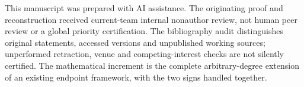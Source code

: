 This manuscript was prepared with AI assistance. The originating
proof and reconstruction received current-team internal nonauthor
review, not human peer review or a global priority certification.
The bibliography audit distinguishes original statements, accessed
versions and unpublished working sources; unperformed retraction,
venue and competing-interest checks are not silently certified.
The mathematical increment is the complete arbitrary-degree
extension of an existing endpoint framework, with the two signs
handled together.
